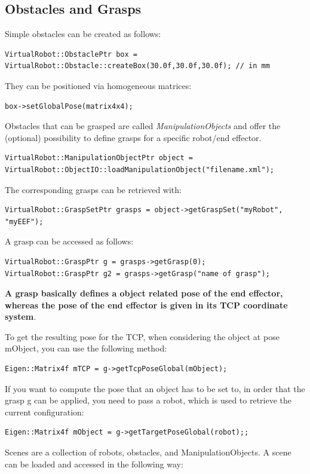 \subsection{Obstacles and Grasps}
Simple obstacles can be created as follows: 
\begin{lstlisting}
VirtualRobot::ObstaclePtr box = VirtualRobot::Obstacle::createBox(30.0f,30.0f,30.0f); // in mm
\end{lstlisting}
They can be positioned via homogeneous matrices: 
\begin{lstlisting}
box->setGlobalPose(matrix4x4);
\end{lstlisting}
Obstacles that can be grasped are called \textit{ManipulationObjects} and offer the (optional) possibility to define grasps for a specific robot/end effector. 
\begin{lstlisting}
VirtualRobot::ManipulationObjectPtr object = VirtualRobot::ObjectIO::loadManipulationObject("filename.xml");
\end{lstlisting}
The corresponding grasps can be retrieved with: 
\begin{lstlisting}
VirtualRobot::GraspSetPtr grasps = object->getGraspSet("myRobot", "myEEF");
\end{lstlisting}
A grasp can be accessed as follows: 
\begin{lstlisting}
VirtualRobot::GraspPtr g = grasps->getGrasp(0);
VirtualRobot::GraspPtr g2 = grasps->getGrasp("name of grasp");
\end{lstlisting}
\textbf{A grasp basically defines a object related pose of the end effector, whereas the pose of the end effector is given in its TCP coordinate system}.\par To get the resulting pose for the TCP, when considering the object at pose mObject, you can use the following method: 
\begin{lstlisting}
Eigen::Matrix4f mTCP = g->getTcpPoseGlobal(mObject);
\end{lstlisting}
If you want to compute the pose that an object has to be set to, in order that the grasp g can be applied, you need to pass a robot, which is used to retrieve the current configuration: 
\begin{lstlisting}
Eigen::Matrix4f mObject = g->getTargetPoseGlobal(robot);;
\end{lstlisting}
Scenes are a collection of robots, obstacles, and ManipulationObjects. A scene can be loaded and accessed in the following way: 
